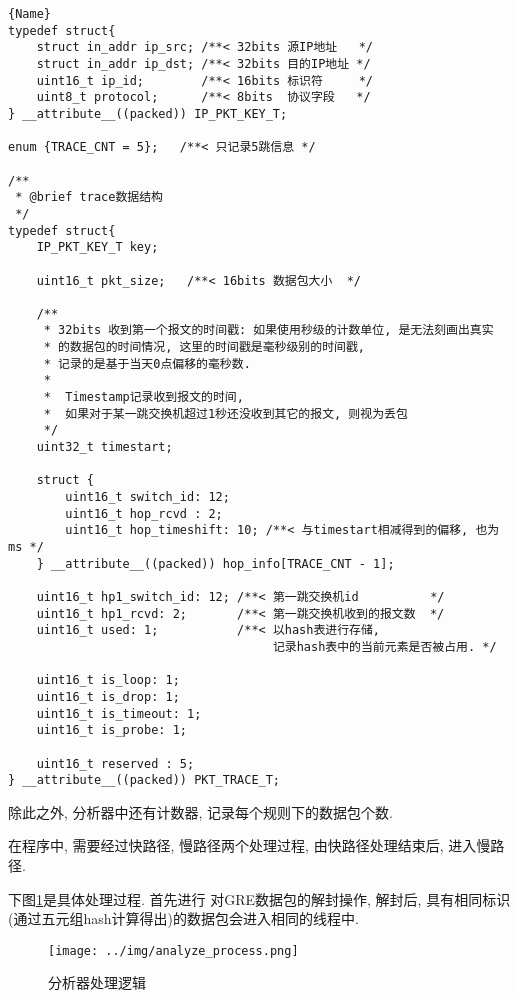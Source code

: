 \label{trace数据结构}
\begin{lstlisting}[caption=Trace数据结构,frame=tlrb]{Name}
typedef struct{
    struct in_addr ip_src; /**< 32bits 源IP地址   */
    struct in_addr ip_dst; /**< 32bits 目的IP地址 */
    uint16_t ip_id;        /**< 16bits 标识符     */
    uint8_t protocol;      /**< 8bits  协议字段   */
} __attribute__((packed)) IP_PKT_KEY_T;

enum {TRACE_CNT = 5};   /**< 只记录5跳信息 */

/**
 * @brief trace数据结构
 */
typedef struct{
    IP_PKT_KEY_T key;

    uint16_t pkt_size;   /**< 16bits 数据包大小  */

    /**
     * 32bits 收到第一个报文的时间戳: 如果使用秒级的计数单位, 是无法刻画出真实
     * 的数据包的时间情况, 这里的时间戳是毫秒级别的时间戳,
     * 记录的是基于当天0点偏移的毫秒数.
     *
     *  Timestamp记录收到报文的时间,
     *  如果对于某一跳交换机超过1秒还没收到其它的报文, 则视为丢包
     */
    uint32_t timestart;

    struct {
        uint16_t switch_id: 12;
        uint16_t hop_rcvd : 2;
        uint16_t hop_timeshift: 10; /**< 与timestart相减得到的偏移, 也为ms */
    } __attribute__((packed)) hop_info[TRACE_CNT - 1];

    uint16_t hp1_switch_id: 12; /**< 第一跳交换机id          */
    uint16_t hp1_rcvd: 2;       /**< 第一跳交换机收到的报文数  */
    uint16_t used: 1;           /**< 以hash表进行存储,
                                     记录hash表中的当前元素是否被占用. */

    uint16_t is_loop: 1;
    uint16_t is_drop: 1;
    uint16_t is_timeout: 1;
    uint16_t is_probe: 1;

    uint16_t reserved : 5;
} __attribute__((packed)) PKT_TRACE_T;
\end{lstlisting}


除此之外, 分析器中还有计数器, 记录每个规则下的数据包个数.

在程序中, 需要经过快路径, 慢路径两个处理过程, 由快路径处理结束后,
进入慢路径.

下图\ref{fig:analyzer_process}是具体处理过程. 首先进行
对GRE数据包的解封操作, 解封后,
具有相同标识(通过五元组hash计算得出)的数据包会进入相同的线程中.

\begin{figure}
  \centering
  \texttt{[image: ../img/analyze\_process.png]}
  \caption{分析器处理逻辑}
  \label{fig:analyzer_process}
\end{figure}

